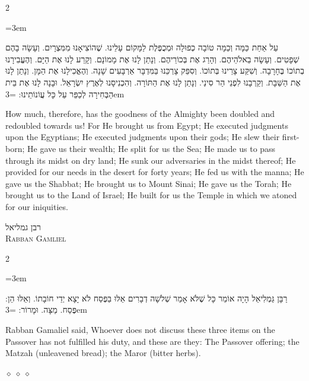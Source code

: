 \documentclass[11pt, openany]{book}
\newcommand{\sederdivider}{%
  \par\vspace{6pt}
  \begin{center}
    \textcolor{sedergold}{\pgfornament[width=1.5cm]{11}}
  \end{center}
  \par\vspace{6pt}
}
\newenvironment{bilingual}{%
  \par\vspace{4pt}%
  \begin{paracol}{2}%
}{%
  \end{paracol}%
  \par\vspace{2pt}%
}
\newenvironment{hebrewcol}{%
  \switchcolumn[1]%
  \begingroup
  \RTL
  \hebrewfont\large
  \setstretch{1.4}%
  \emergencystretch=3em
  \tolerance=9999
  \parindent=0pt\relax
}{%
  \endRTL
  \endgroup
}
\newenvironment{englishcol}{%
  \switchcolumn[0]%
  \begingroup
  \setstretch{1.4}%
  \emergencystretch=3em
  \tolerance=9999
  \normalsize
  \rightskip=0.12in\relax
}{%
  \endgroup
}
\newcommand{\parasep}{%
  \par\vspace{3pt}
  \begin{center}
    \textcolor{sedergold!50}{\tiny$\diamond\;\diamond\;\diamond$}
  \end{center}
  \par\vspace{3pt}
}
\newcommand{\subsedertitle}[2]{%
  \par\vspace{8pt}
  \begin{center}
    {\hebrewfontlarge\textcolor{sederblue}{\beginR #1\endR}}\\[3pt]
    {\normalsize\scshape\textcolor{sederblue}{#2}}
  \end{center}
  \par\vspace{3pt}
}
\begin{document}
\begin{bilingual}
\begin{hebrewcol}
עַל אַחַת כַּמָּה וְכַמָּה טוֹבָה כְפוּלָה וּמְכֻפֶּלֶת לַמָּקוֹם עָלֵינוּ. שֶׁהוֹצִיאָנוּ מִמִּצְרָיִם. וְעָשָׂה בָהֶם שְׁפָטִים. וְעָשָׂה בֵאלֹהֵיהֶם. וְהָרַג אֶת בְּכוֹרֵיהֶם. וְנָתַן לָנוּ אֶת מָמוֹנָם. וְקָרַע לָנוּ אֶת הַיָּם. וְהֶעֱבִירָנוּ בְתוֹכוֹ בֶּחָרָבָה. וְשִׁקַּע צָרֵינוּ בְּתוֹכוֹ. וְסִפֵּק צָרְכֵּנוּ בַּמִּדְבָּר אַרְבָּעִים שָׁנָה. וְהֶאֱכִילָנוּ אֶת הַמָּן. וְנָתַן לָנוּ אֶת הַשַּׁבָּת. וְקֵרְבָנוּ לִפְנֵי הַר סִינַי. וְנָתַן לָנוּ אֶת הַתּוֹרָה. וְהִכְנִיסָנוּ לְאֶרֶץ יִשְׂרָאֵל. וּבָנָה לָנוּ אֶת בֵּית הַבְּחִירָה לְכַפֵּר עַל כָּל עֲוֹנוֹתֵינוּ:
\end{hebrewcol}
\begin{englishcol}
How much, therefore, has the goodness of the Almighty been doubled and redoubled towards us! For He brought us from Egypt; He executed judgments upon the Egyptians; He executed judgments upon their gods; He slew their first-born; He gave us their wealth; He split for us the Sea; He made us to pass through its midst on dry land; He sunk our adversaries in the midst thereof; He provided for our needs in the desert for forty years; He fed us with the manna; He gave us the Shabbat; He brought us to Mount Sinai; He gave us the Torah; He brought us to the Land of Israel; He built for us the Temple in which we atoned for our iniquities.
\end{englishcol}
\end{bilingual}
\sederdivider

\subsedertitle{רבן גמליאל}{Rabban Gamliel}

\begin{bilingual}
\begin{hebrewcol}
רַבָּן גַּמְלִיאֵל הָיָה אוֹמֵר כָּל שֶׁלֹּא אָמַר שְׁלֹשָׁה דְבָרִים אֵלּוּ בַּפֶּסַח לֹא יָצָא יְדֵי חוֹבָתוֹ. וְאֵלּוּ הֵן: פֶּסַח. מַצָּה. וּמָרוֹר:
\end{hebrewcol}
\begin{englishcol}
Rabban Gamaliel said, Whoever does not discuss these three items on the Passover has not fulfilled his duty, and these are they: The Passover offering; the Matzah (unleavened bread); the Maror (bitter herbs).
\end{englishcol}
\end{bilingual}
\parasep
\end{document}
